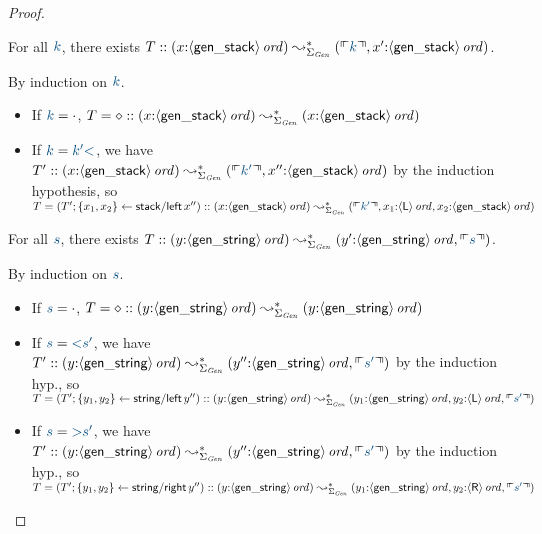 \begin{proof}
\begin{lemma} For all $\obj{k}$, there exists
$T :: ({x{:}\istrue{\susp{\sf gen\_stack}}}) \leadsto^*_{\Sigma_{\it Gen}} 
({\ctxinterp{k}, x'{:}\istrue{\susp{\sf gen\_stack}}})$.
\end{lemma}
\noindent
By induction on $\obj{k}$. 
\begin{itemize}
\item If $\obj{k} = \cdot$, $T = \diamond ::
({x{:}{\langle {\sf gen\_stack} \rangle}\,{{\it ord}}}) \leadsto^*_{\Sigma_{\it Gen}} 
(x{:}{\langle {\sf gen\_stack} \rangle}\,{{\it ord}})$
\item If $\obj{k} = \obj{k' {\sf <}}$, we have 
$T' :: ({x{:}\istrue{\susp{\sf gen\_stack}}}) \leadsto^*_{\Sigma_{\it Gen}} 
({\ctxinterp{k'}, x''{:}\istrue{\susp{\sf gen\_stack}}})$ by the induction
hypothesis, so $T = (T'; \trstep{x_1, x_2}{{\sf stack/left}\,x''}) :: 
({x{:}\istrue{\susp{\sf gen\_stack}}}) \leadsto^*_{\Sigma_{\it Gen}} 
({\ctxinterp{k'}, x_1{:}\istrue{\susp{\sf L}}, x_2{:}\istrue{\susp{\sf gen\_stack}}})$
\end{itemize}

\begin{lemma} For all $\obj{s}$, there exists
$T :: ({y{:}\istrue{\susp{\sf gen\_string}}}) \leadsto^*_{\Sigma_{\it Gen}} 
({y'{:}\istrue{\susp{\sf gen\_string}}, \ctxinterp{s}})$.
\end{lemma}
\noindent
By induction on $\obj{s}$.
\begin{itemize}
\item If $\obj{s} = \cdot$, $T = \diamond ::
({y{:}{\langle {\sf gen\_string} \rangle}\,{{\it ord}}}) \leadsto^*_{\Sigma_{\it Gen}} 
(y{:}{\langle {\sf gen\_string} \rangle}\,{{\it ord}})$
\item If $\obj{s} = \obj{{\sf <}s' }$, we have 
$T' :: ({y{:}\istrue{\susp{\sf gen\_string}}}) \leadsto^*_{\Sigma_{\it Gen}} 
(y''{:}\istrue{\susp{\sf gen\_string}}, \ctxinterp{s'})$ by the induction
hyp., so $T = (T'; \trstep{y_1, y_2}{{\sf string/left}\,y''}) :: 
({y{:}\istrue{\susp{\sf gen\_string}}}) \leadsto^*_{\Sigma_{\it Gen}} 
(y_1{:}\istrue{\susp{\sf gen\_string}},
 y_2{:}\istrue{\susp{\sf L}},
\ctxinterp{s'})$
\item If $\obj{s} = \obj{{\sf >}s' }$, we have 
$T' :: ({y{:}\istrue{\susp{\sf gen\_string}}}) \leadsto^*_{\Sigma_{\it Gen}} 
(y''{:}\istrue{\susp{\sf gen\_string}}, \ctxinterp{s'})$ by the induction
hyp., so $T = (T'; \trstep{y_1, y_2}{{\sf string/right}\,y''}) :: 
({y{:}\istrue{\susp{\sf gen\_string}}}) \leadsto^*_{\Sigma_{\it Gen}} 
(y_1{:}\istrue{\susp{\sf gen\_string}},
 y_2{:}\istrue{\susp{\sf R}},
\ctxinterp{s'})$
\end{itemize}


\end{proof}
